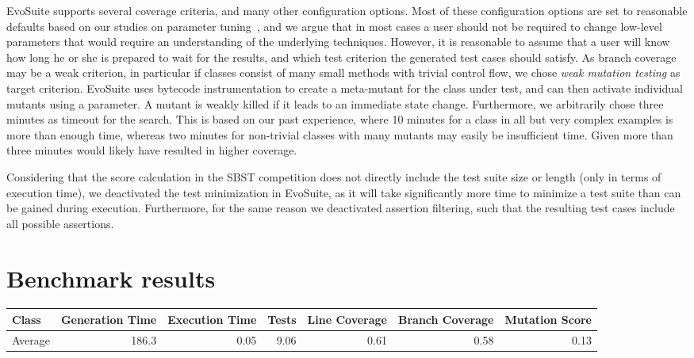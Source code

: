 \documentclass[10pt,conference,compsocconf]{IEEEtran}
\newcommand{\EVOSUITE}{{\sc EvoSuite}\xspace}
\begin{document}
\EVOSUITE supports several coverage criteria, and many other
configuration options. Most of these configuration options are set to
reasonable defaults based on our studies on parameter
tuning~\cite{ArF11}, and we argue that in most cases a user should not
be required to change low-level parameters that would require an
understanding of the underlying techniques. However, it is reasonable
to assume that a user will know how long he or she is prepared to wait
for the results, and which test criterion the generated test cases
should satisfy. As branch coverage may be a weak criterion, in
particular if classes consist of many small methods with trivial
control flow, we chose \emph{weak mutation testing} as target
criterion. \EVOSUITE uses bytecode instrumentation to create a
meta-mutant for the class under test, and can then activate individual
mutants using a parameter. A mutant is weakly killed if it leads to an
immediate state change. Furthermore, we arbitrarily chose three
minutes as timeout for the search. This is based on our past
experience, where 10 minutes for a class in all but very complex
examples is more than enough time, whereas two minutes for non-trivial
classes with many mutants may easily be insufficient time. Given more
than three minutes would likely have resulted in higher coverage.

Considering that the score calculation in the SBST competition does
not directly include the test suite size or length (only in terms of
execution time), we deactivated the test minimization in \EVOSUITE, as
it will take significantly more time to minimize a test suite than can
be gained during execution. Furthermore, for the same reason we
deactivated assertion filtering, such that the resulting test cases
include all possible assertions.

\section{Benchmark results}

\begin{table*}[t]
  \centering
  \caption{\label{table:results}Detailed results of \EVOSUITE on the SBST benchmark classes.}
  \scriptsize
  \begin{tabular}{l rrrrrr} \toprule
Class & Generation Time & Execution Time  & Tests & Line Coverage & Branch
Coverage & Mutation Score \\ 
\midrule


\midrule
Average & 186.3 & 0.05 & 9.06 & 0.61 & 0.58 & 0.13\\
\bottomrule
  \end{tabular}
\end{table*}
\end{document}
